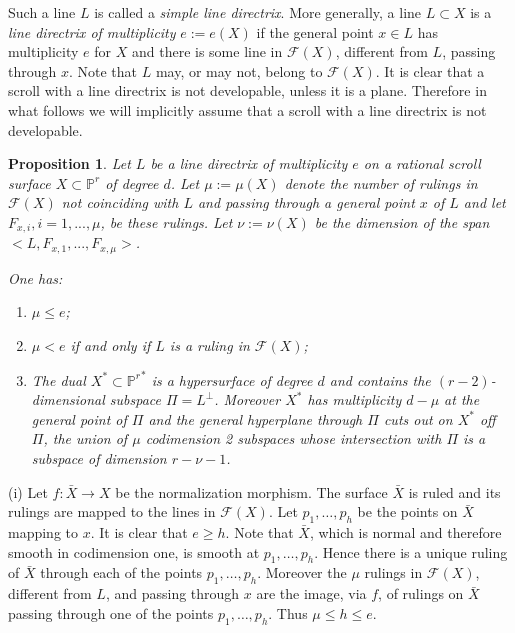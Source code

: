 \documentclass[11pt]{article}   %
\newtheorem{Proposition}[Theorem]{Proposition}
\theoremstyle{definition}
\numberwithin{Theorem}{section} \numberwithin{equation}{section}
\def\demo{\noindent{\it Proof. }}
\newcommand{\F}{{\mathcal F}}
\newcommand{\p}{{\mathbb P}}
\begin{document}
{Such a line $L$ is called a {\it simple line directrix}. More
generally, a line $L\subset X$ is a {\it line directrix of
multiplicity\/} $e:=e(X)$ if the general point $x\in L$ has
multiplicity $e$ for $X$ and there is some line in $\F(X)$,
different from $L$, passing through $x$. Note that $L$ may, or may
not, belong to $\F(X)$. It is clear that a scroll with a line
directrix is not developable, unless it is a plane. Therefore in
what follows we will implicitly assume that a scroll with a line
directrix is not developable.


\medskip

\begin{Proposition}\label{directrix}
Let $L$ be a line directrix of multiplicity $e$ on a rational scroll
surface $X\subset \p^ r$ of degree $d$. Let $\mu:=\mu(X)$ denote
the number of rulings in $\F(X)$ {not
coinciding with} $L$ and passing through a
general point ${ x}$ {of} ${L}$ and let
$F_{x,i}, i=1,...,\mu$, be these rulings. Let $\nu:=\nu(X)$ be the
dimension of the span  $<L, F_{x,1},...,F_{x,\mu}>$.

One has:
\begin{enumerate}
\item[{\rm (i)}] $\mu\leq e${\rm ;}
\item[{\rm (ii)}]
$\mu<e$ if and only if $L$ is a ruling in $\F(X)${\rm ;}
\item[{\rm (iii)}] The dual $X^ *\subset {\p^r} ^*$ is a hypersurface of degree $d$
and contains the $(r-2)$-dimensional subspace $\Pi=L^ \perp$.
Moreover $X^*$ has multiplicity $d-\mu$ at the general point of
$\Pi$ and the general hyperplane through $\Pi$ cuts out on $X^ *$
off $\Pi$, the union of $\mu$ codimension 2 subspaces whose intersection
with $\Pi$ is a subspace of dimension $r-\nu-1$.
\end{enumerate}
\end{Proposition}

\demo (i) Let $f: \bar X\to X$ be the normalization morphism. The
surface $\bar X$ is ruled and its rulings are mapped to the lines in
$\F(X)$.  Let $p_1,\dots,p_h$ be the points on
$\bar X$ mapping to $x$.  It is clear that $e\geq h$. Note that
$\bar X$, which is normal and therefore smooth in codimension one,
is smooth at $p_1,\dots, p_h$. Hence there is a unique ruling of
$\bar X$ through each of the points $p_1,\dots, p_h$. Moreover the
$\mu$ rulings in $\F(X)$, different from $L$, and passing through
$x$ are the image, via $f$, of rulings on $\bar X$ passing through
one of the points $p_1,\dots, p_h$. Thus $\mu\leq h\leq e$.


}
\end{document}
